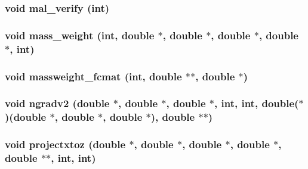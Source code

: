 \subsubsection{\setlength{\rightskip}{0pt plus 5cm}void mal\_\-verify (int)}\label{md__proto_8h_87051351b4758adbcfc4c35051e76ad4}


\subsubsection{\setlength{\rightskip}{0pt plus 5cm}void mass\_\-weight (int, double $\ast$, double $\ast$, double $\ast$, double $\ast$, int)}\label{md__proto_8h_cdfd1bb8b93aba0a80ebecce87aae16c}


\subsubsection{\setlength{\rightskip}{0pt plus 5cm}void massweight\_\-fcmat (int, double $\ast$$\ast$, double $\ast$)}\label{md__proto_8h_b23ece73d4af491d2594eefc9b049ffd}


\subsubsection{\setlength{\rightskip}{0pt plus 5cm}void ngradv2 (double $\ast$, double $\ast$, double $\ast$, int, int, double($\ast$)(double $\ast$, double $\ast$, double $\ast$), double $\ast$$\ast$)}\label{md__proto_8h_d096539b8c7f3d34087feae57d0b1eea}


\subsubsection{\setlength{\rightskip}{0pt plus 5cm}void projectxtoz (double $\ast$, double $\ast$, double $\ast$, double $\ast$, double $\ast$$\ast$, int, int)}\label{md__proto_8h_38c9e46bbd1e93896283bdec87e8aef1}


